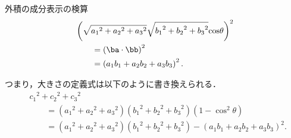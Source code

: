 \begin{mysmallsec}{外積の成分表示の検算}
                    \begin{align*}
                        &\left(
                            \sqrt{{a_{1}}^{2}+{a_{2}}^{2}+{a_{3}}^{2}}
                            \sqrt{{b_{1}}^{2}+{b_{2}}^{2}+{b_{3}}^{2}}
                            {\cos}\theta
                        \right)^{2} \\
                            &\qquad=
                            \left(
                                \ba \cdot \bb
                            \right)^{2} \\
                            &\qquad=
                            \left(
                                a_{1}b_{1}+a_{2}b_{2}+a_{3}b_{3}
                            \right)^{2}.
                    \end{align*}

                つまり，大きさの定義式は以下のように書き換えられる．
                    \begin{align*}
                        &{c_{1}}^{2}+{c_{2}}^{2}+{c_{3}}^{2} \\
                        &\qquad =   \left({a_{1}}^{2}+{a_{2}}^{2}+{a_{3}}^{2}\right)
                                    \left({b_{1}}^{2}+{b_{2}}^{2}+{b_{3}}^{2}\right)
                                    \left(1 - {\cos}^{2}\theta \right) \\
                        &\qquad =   \left({a_{1}}^{2}+{a_{2}}^{2}+{a_{3}}^{2}\right)
                                    \left({b_{1}}^{2}+{b_{2}}^{2}+{b_{3}}^{2}\right)
                                    -   \left(
                                            a_{1}b_{1}+a_{2}b_{2}+a_{3}b_{3}
                                        \right)^{2}.
                    \end{align*}


\end{mysmallsec}
